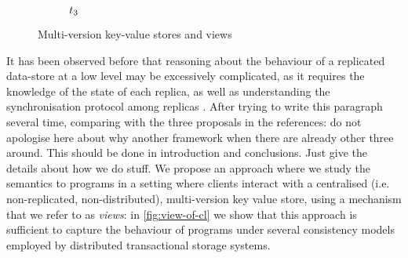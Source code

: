 \begin{figure*}[t]
\begin{center}
\begin{subfigure}{0.32\textwidth}
\caption{\( \txid_3 \)}
\label{fig:long-fork-t3}
\label{fig:cp-disallowed-1}
\end{subfigure}

\end{center}

\hrulefill

\caption{Multi-version key-value stores and views}
\label{fig:hheap}
\label{fig:key-value-and-view}
\end{figure*}

It has been observed before that reasoning about the behaviour of a replicated data-store at a low level 
may be excessively complicated, as it requires the knowledge of the state of each 
replica, as well as understanding the synchronisation protocol among replicas \cite{framework-concur,adya,seebelieve}. 
\ac{After trying to write this paragraph several time, comparing with the three proposals in the references: 
do not apologise here about why another framework when there are already other three around. This should 
be done in introduction and conclusions. Just give the details about how we do stuff.} 
We propose an approach where we study the semantics to programs in a setting where 
clients interact with a centralised (i.e. non-replicated, non-distributed), multi-version key value store, 
using a mechanism that we refer to as \emph{views}: in \cref{fig:view-of-cl} we show that this approach 
is sufficient to capture the behaviour of programs under several consistency models 
employed by distributed transactional storage systems.

